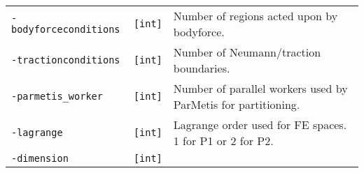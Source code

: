 \begin{longtable}[]{@{}lll@{}}
\begin{minipage}[t]{0.26\columnwidth}
\lstinline!-bodyforceconditions!\strut
\end{minipage} & \begin{minipage}[t]{0.09\columnwidth}\raggedright\strut
\lstinline![int]!\strut
\end{minipage} & \begin{minipage}[t]{0.56\columnwidth}\raggedright\strut
Number of regions acted upon by bodyforce.\strut
\end{minipage}\tabularnewline
\begin{minipage}[t]{0.26\columnwidth}\raggedright\strut
\lstinline!-tractionconditions!\strut
\end{minipage} & \begin{minipage}[t]{0.09\columnwidth}\raggedright\strut
\lstinline![int]!\strut
\end{minipage} & \begin{minipage}[t]{0.56\columnwidth}\raggedright\strut
Number of Neumann/traction boundaries.\strut
\end{minipage}\tabularnewline
\begin{minipage}[t]{0.26\columnwidth}\raggedright\strut
\lstinline!-parmetis_worker!\strut
\end{minipage} & \begin{minipage}[t]{0.09\columnwidth}\raggedright\strut
\lstinline![int]!\strut
\end{minipage} & \begin{minipage}[t]{0.56\columnwidth}\raggedright\strut
Number of parallel workers used by ParMetis for partitioning.\strut
\end{minipage}\tabularnewline
\begin{minipage}[t]{0.26\columnwidth}\raggedright\strut
\lstinline!-lagrange!\strut
\end{minipage} & \begin{minipage}[t]{0.09\columnwidth}\raggedright\strut
\lstinline![int]!\strut
\end{minipage} & \begin{minipage}[t]{0.56\columnwidth}\raggedright\strut
Lagrange order used for FE spaces. 1 for P1 or 2 for P2.\strut
\end{minipage}\tabularnewline
\begin{minipage}[t]{0.26\columnwidth}\raggedright\strut
\lstinline!-dimension!\strut
\end{minipage} & \begin{minipage}[t]{0.09\columnwidth}\raggedright\strut
\lstinline![int]!\strut
\end{minipage} & \begin{minipage}[t]{0.56\columnwidth}\raggedright\strut

\end{minipage}
\end{longtable}
